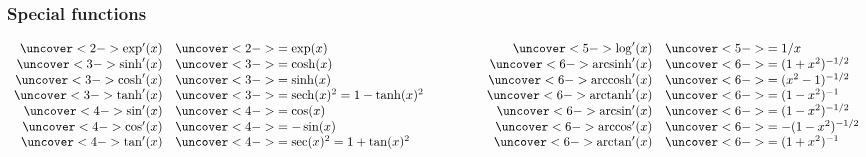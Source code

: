 \documentclass[9pt]{beamer}
\begin{document}
\begin{frame}[t]
 \frametitle{Special functions}
 \[ \begin{array}{rlcrl}
   \uncover<2->{\exp'(x)}     & \uncover<2->{=\exp(x)} &\hspace{3em}&
   \uncover<5->{\log'(x)}     & \uncover<5->{=1/x} \\
   \uncover<3->{\sinh'(x)}    & \uncover<3->{=\cosh(x)} &&
   \uncover<6->{\arcsinh'(x)} & \uncover<6->{=(1+x^2)^{-1/2}} \\
   \uncover<3->{\cosh'(x)}    & \uncover<3->{=\sinh(x)} &&
   \uncover<6->{\arccosh'(x)} & \uncover<6->{=(x^2-1)^{-1/2}} \\
   \uncover<3->{\tanh'(x)}    & \uncover<3->{=\sech(x)^2 = 1 - \tanh(x)^2} &&
   \uncover<6->{\arctanh'(x)} & \uncover<6->{=(1-x^2)^{-1}} \\
   \uncover<4->{\sin'(x)}     & \uncover<4->{=\cos(x)} &&
   \uncover<6->{\arcsin'(x)}  & \uncover<6->{=(1-x^2)^{-1/2}} \\
   \uncover<4->{\cos'(x)}     & \uncover<4->{=-\sin(x)} &&
   \uncover<6->{\arccos'(x)}  & \uncover<6->{=-(1-x^2)^{-1/2}} \\
   \uncover<4->{\tan'(x)}     & \uncover<4->{=\sec(x)^2 = 1 + \tan(x)^2} &&
   \uncover<6->{\arctan'(x)}  & \uncover<6->{=(1+x^2)^{-1}}
  \end{array} \]
 \begin{itemize}
 \end{itemize}
\end{frame}
\end{document}
